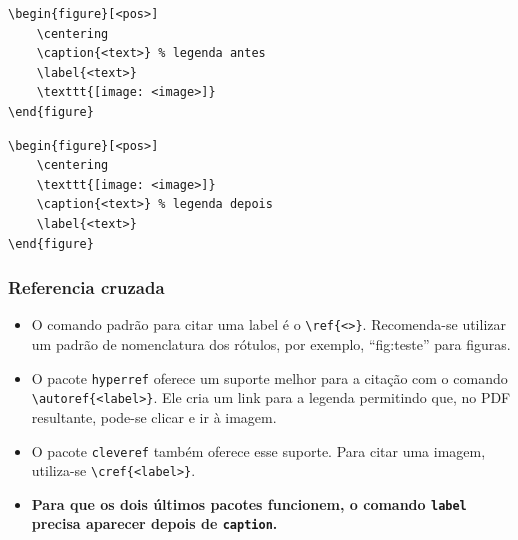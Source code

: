 \documentclass{beamer}
\begin{document}
\begin{frame}[fragile]
    \begin{lstlisting}[style=myStyleLatex]
\begin{figure}[<pos>]
    \centering
    \caption{<text>} % legenda antes
    \label{<text>}
    \texttt{[image: <image>]}
\end{figure}
\end{lstlisting}

\end{frame}

\begin{frame}[fragile]

    \begin{lstlisting}[style=myStyleLatex]
\begin{figure}[<pos>]
    \centering
    \texttt{[image: <image>]}
    \caption{<text>} % legenda depois
    \label{<text>}
\end{figure}
\end{lstlisting}

\end{frame}

\begin{frame}[fragile]
    \frametitle{Referencia cruzada}
    \begin{itemize}
        \item O comando padrão para citar uma label é o \lstinline[style=myStyleLatex]!\ref{<>}!. Recomenda-se utilizar um padrão de nomenclatura dos rótulos, por exemplo, ``fig:teste'' para figuras.
        \item O pacote \texttt{hyperref} oferece um suporte melhor para a citação com o comando \lstinline[style=myStyleLatex]!\autoref{<label>}!. Ele cria um link para a legenda permitindo que, no PDF resultante, pode-se clicar e ir à imagem.
        \item O pacote \texttt{cleveref} também oferece esse suporte. Para citar uma imagem, utiliza-se \lstinline[style=myStyleLatex]!\cref{<label>}!.
        \item \textbf{Para que os dois últimos pacotes funcionem, o comando \texttt{label} precisa aparecer depois de \texttt{caption}.}
    \end{itemize}
\end{frame}
\end{document}
